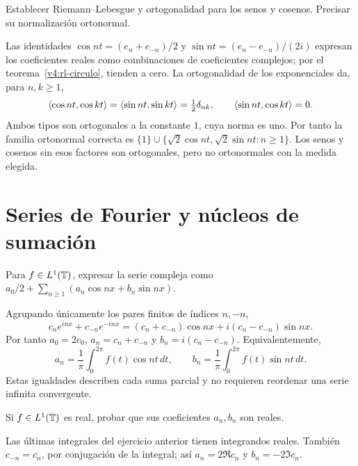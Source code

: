 \begin{ejercicio}\label{ej:v4-l03-2}
Establecer Riemann--Lebesgue y ortogonalidad para los senos y cosenos. Precisar su normalización ortonormal.
\end{ejercicio}
\begin{solucion}
Las identidades $\cos nt=(e_n+e_{-n})/2$ y $\sin nt=(e_n-e_{-n})/(2i)$ expresan los coeficientes reales como combinaciones de coeficientes complejos; por el teorema~\ref{v4:rl-circulo}, tienden a cero. La ortogonalidad de los exponenciales da, para $n,k\geq1$,
\[
 \left\langle\cos nt,\cos kt\right\rangle=\left\langle\sin nt,\sin kt\right\rangle=\tfrac12\delta_{nk},
 \qquad\left\langle\sin nt,\cos kt\right\rangle=0.
\]
Ambos tipos son ortogonales a la constante $1$, cuya norma es uno. Por tanto la familia ortonormal correcta es $\{1\}\cup\{\sqrt2\cos nt,\sqrt2\sin nt:n\geq1\}$. Los senos y cosenos sin esos factores son ortogonales, pero no ortonormales con la medida elegida.
\end{solucion}

\chapter{Series de Fourier y núcleos de sumación}

\begin{ejercicio}\label{ej:v4-l04-1}
Para $f\in L^1(\mathbb T)$, expresar la serie compleja como $a_0/2+\sum_{n\geq1}(a_n\cos nx+b_n\sin nx)$.
\end{ejercicio}
\begin{solucion}
Agrupando únicamente los pares finitos de índices $n,-n$,
\[
 c_ne^{inx}+c_{-n}e^{-inx}
 =(c_n+c_{-n})\cos nx+i(c_n-c_{-n})\sin nx.
\]
Por tanto $a_0=2c_0$, $a_n=c_n+c_{-n}$ y $b_n=i(c_n-c_{-n})$. Equivalentemente,
\[
 a_n=\frac1\pi\int_0^{2\pi}f(t)\cos nt\,dt,\qquad
 b_n=\frac1\pi\int_0^{2\pi}f(t)\sin nt\,dt.
\]
Estas igualdades describen cada suma parcial y no requieren reordenar una serie infinita convergente.
\end{solucion}

\begin{ejercicio}\label{ej:v4-l04-2}
Si $f\in L^1(\mathbb T)$ es real, probar que sus coeficientes $a_n,b_n$ son reales.
\end{ejercicio}
\begin{solucion}
Las últimas integrales del ejercicio anterior tienen integrandos reales. También $c_{-n}=\overline{c_n}$, por conjugación de la integral; así $a_n=2\Re c_n$ y $b_n=-2\Im c_n$.
\end{solucion}

